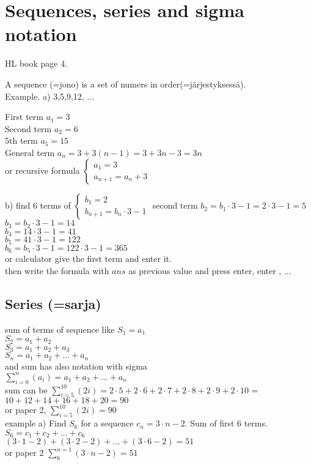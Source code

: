 \section{Sequences, series and sigma notation}

HL book page 4.

A sequence (=jono) is a set of numers in order(=järjestyksessä).\\

Example. a) 3,5,9,12, ...

First term $a_1=3$\\
Second term $a_2=6$\\
5th term $a_5=15$\\
General term $a_n=3+3(n-1)=3+3n-3=3n$\\
or recursive formula $\begin{cases}
a_1=3 \\ a_{n+1}=a_n+3
\end{cases}$

b) find 6 terms of $\begin{cases}
b_1=2\\
b_{n+1}=b_n\cdot 3-1
\end{cases}$ 
second term $b_2=b_1\cdot 3-1=2\cdot 3-1=5$\\
$b_3=b_2\cdot 3-1=14$\\
$b_4=14\cdot 3-1=41$\\
$b_5=41\cdot 3-1=122$\\
$b_6=b_5\cdot 3-1=122\cdot 3-1=365$\\
or calculator give the first term and enter it.\\
then write the formula with $ans$ as previous value and press enter, enter , ...

\subsection{Series (=sarja)}
sum of terms of sequence like $S_1=a_1$\\
$S_2=a_1+a_2$\\
$S_3=a_1+a_2+a_3$\\
$S_n=a_1+a_2+...+a_n$\\
and sum has also notation with sigma\\
$\sum_{i=0}^{n}(a_i)=a_1 + a_2 + ... +a_n$\\

sum can be $\sum_{i=5}^{10}(2i)=2\cdot 5+2\cdot6+2\cdot7+2\cdot8+2\cdot9+2\cdot10$
=$10+12+14+16+18+20=90$\\
or paper 2, $\sum_{i=5}^{10}(2i)=90$\\ 
example
a) Find $S_6$ for a sequence $c_n=3\cdot n-2$.
Sum of first 6 terms. $S_6=c_1+c_2+...+c_6$\\
$(3\cdot1-2)+(3\cdot2-2)+...+(3\cdot6-2)=51$\\
or paper 2 $\sum_{6}^{n=1}(3\cdot n-2)=51$

